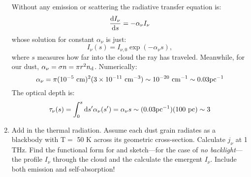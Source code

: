 \documentclass[11pt, preprint]{article}
\begin{document}
\begin{enumerate}
  \begin{answer}
    Without any emission or scattering the radiative transfer equation
    is: 
    \begin{equation}
      \frac{{\rm d}I_\nu}{{\rm d}s} = -\alpha_\nu I_\nu
    \end{equation}
    whose solution for constant $\alpha_\nu$ is just:
    \begin{equation}
      I_\nu(s) = I_{\nu, 0} \exp\left(- \alpha_\nu s\right),
    \end{equation}
    where $s$ measures how far into the cloud the ray has
    traveled. Meanwhile, for our dust, $\alpha_\nu = \sigma n = \pi
    r^2 n_{\rm d}$.  Numerically:
    \begin{equation}
      \alpha_\nu = \pi (10^{-5} {\rm ~cm})^2 (3\times 10^{-11} {\rm
        ~cm}^{-3}) \sim 10^{-20} {\rm ~cm}^{-1} \sim 0.03 {\rm
        pc}^{-1}
    \end{equation}
    The optical depth is:
    \begin{equation}
      \tau_\nu(s) = \int_0^s {\rm d}s' \alpha_\nu(s') = \alpha_\nu s
      \sim (0.03 {\rm pc}^{-1}) (100 {\rm ~pc}) \sim 3
    \end{equation}
  \end{answer}
\item Add in the thermal radiation. Assume each dust grain radiates
  as a blackbody  with T$=$ 50 K across its geometric
  cross-section. Calculate $j_\nu$ at 1 THz. Find the functional form
  for and sketch---for the case of {\it no backlight}---the 
  profile $I_\nu$ through the cloud and the calculate the emergent
  $I_\nu$. Include both emission and self-absorption!


\end{enumerate}
\end{document}
